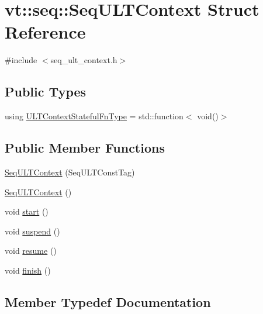 \hypertarget{structvt_1_1seq_1_1_seq_u_l_t_context}{}\section{vt\+:\+:seq\+:\+:Seq\+U\+L\+T\+Context Struct Reference}
\label{structvt_1_1seq_1_1_seq_u_l_t_context}


{\ttfamily \#include $<$seq\+\_\+ult\+\_\+context.\+h$>$}

\subsection*{Public Types}
\begin{DoxyCompactItemize}
\item 
using \hyperlink{structvt_1_1seq_1_1_seq_u_l_t_context_a9e5b67a27cbe4f6b311389ff41918268}{U\+L\+T\+Context\+Stateful\+Fn\+Type} = std\+::function$<$ void()$>$
\end{DoxyCompactItemize}
\subsection*{Public Member Functions}
\begin{DoxyCompactItemize}
\item 
\hyperlink{structvt_1_1seq_1_1_seq_u_l_t_context_a693f5363ed2f5f50f67b8c6ab358aa82}{Seq\+U\+L\+T\+Context} (Seq\+U\+L\+T\+Const\+Tag)
\item 
\hyperlink{structvt_1_1seq_1_1_seq_u_l_t_context_af4bbbaab751ef328116aaf496251beb4}{Seq\+U\+L\+T\+Context} ()
\item 
void \hyperlink{structvt_1_1seq_1_1_seq_u_l_t_context_abb7cd6fec4c20c7209983dbe7ceb3840}{start} ()
\item 
void \hyperlink{structvt_1_1seq_1_1_seq_u_l_t_context_a0ba4bc4cd4d3932e827d656102f193ee}{suspend} ()
\item 
void \hyperlink{structvt_1_1seq_1_1_seq_u_l_t_context_a7e2219721366d8467791e9ee73d7c41e}{resume} ()
\item 
void \hyperlink{structvt_1_1seq_1_1_seq_u_l_t_context_a256be8ed6a12436370ac4199c56e5476}{finish} ()
\end{DoxyCompactItemize}


\subsection{Member Typedef Documentation}
\mbox{\label{structvt_1_1seq_1_1_seq_u_l_t_context_a9e5b67a27cbe4f6b311389ff41918268}} 
